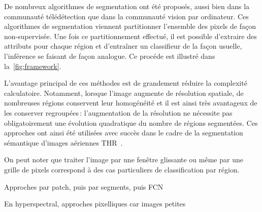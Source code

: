 De nombreux algorithmes de segmentation ont été proposés, aussi bien dans la communauté télédétection que dans la communauté vision par ordinateur. Ces algorithmes de segmentation viennent partitionner l'ensemble des pixels de façon non-supervisée. Une fois ce partitionnement effectué, il est possible d'extraire des attributs pour chaque région et d'entraîner un classifieur de la façon usuelle, l'inférence se faisant de façon analogue. Ce procéde est illustré dans la~\cref{fig:framework}.

L'avantage principal de ces méthodes est de grandement réduire la complexité calculatoire. Notamment, lorsque l'image augmente de résolution spatiale, de nombreuses régions conservent leur homogénéité et il est ainsi très avantageux de les conserver regroupées\,: l'augmentation de la résolution ne nécessite pas obligatoirement une évolution quadratique du nombre de régions segmentées. Ces approches ont ainsi été utilisées avec succès dans le cadre de la segmentation sémantique d'images aériennes \gls{THR}~\cite{lagrange_benchmarking_2015,vargas_superpixel-based_2014}.

On peut noter que traiter l'image par une fenêtre glissante ou même par une grille de pixels correspond à des cas particuliers de classification par région.

Approches par patch, puis par segments, puis FCN

En hyperspectral, approches pixelliques car images petites




